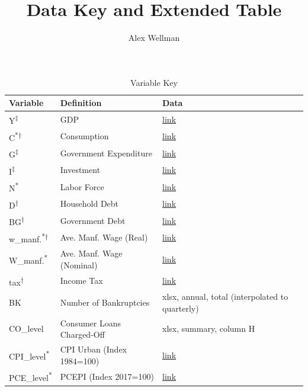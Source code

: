 \documentclass{article}
\title{Data Key and Extended Table}
\author{Alex Wellman}
\begin{document}
\pagestyle{fancy}
\fancyhf{}

\begin{table}[H!]
\caption{Variable Key}
\centering
\begin{adjustbox}{width=\textwidth,center}
\begin{tabular}{lll}
\hline
Variable & Definition & Data  \\
\hline
Y\textsuperscript{‡} & GDP & \href{https://fred.stlouisfed.org/series/GDPC1}{link} \\
C\textsuperscript{*}\textsuperscript{†} & Consumption & \href{https://fred.stlouisfed.org/series/PCEC96}{link} \\
G\textsuperscript{‡} & Government Expenditure & \href{https://fred.stlouisfed.org/series/GCEC1}{link} \\
I\textsuperscript{‡} & Investment & \href{https://fred.stlouisfed.org/series/GPDIC1}{link} \\
N\textsuperscript{*} & Labor Force & \href{https://fred.stlouisfed.org/series/PAYEMS}{link}  \\
D\textsuperscript{†} & Household Debt & \href{https://fred.stlouisfed.org/series/HCCSDODNS}{link}\\
BG\textsuperscript{†} & Government Debt &  \href{https://fred.stlouisfed.org/series/GFDEBTN}{link} \\
w_{manf.}\textsuperscript{*†}  & Ave. Manf. Wage (Real) & \href{https://fred.stlouisfed.org/series/CES3000000008}{link} \\
W_{manf.}\textsuperscript{*}  & Ave. Manf. Wage (Nominal) & \href{https://fred.stlouisfed.org/series/CES3000000008}{link} \\
tax\textsuperscript{†} & Income Tax & \href{https://fred.stlouisfed.org/series/A074RC1Q027SBEA}{link} \\
BK & Number of Bankruptcies & xlsx, annual, total (interpolated to quarterly)\\ 
CO_{level} & Consumer Loans Charged-Off & xlsx, summary, column H\\ 
CPI_{level}\textsuperscript{*} & CPI Urban (Index 1984=100) & \href{https://fred.stlouisfed.org/series/CPIAUCSL}{link}   \\ 
PCE_{level}\textsuperscript{*} & PCEPI (Index 2017=100) & \href{https://fred.stlouisfed.org/series/PCEPI}{link}    \\ 


\end{tabular}
\end{adjustbox}
\end{table}
\end{document}

